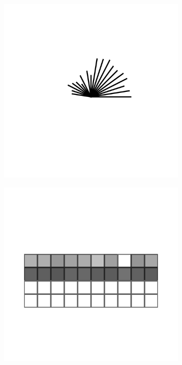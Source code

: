\begin{figure}[ht]
\begin{subfigure}{0.23\linewidth}
\caption{}
\label{subfig:pie}
\end{subfigure}%
\hspace*{0.01\linewidth}%
\begin{subfigure}{0.23\linewidth}
\centering
\includegraphics[width=\linewidth,clip,trim={2.4cm 4cm 1.7cm 4cm}]{infuse/g2}
\caption{}
\label{subfig:star}
\end{subfigure}%
\hspace*{0.01\linewidth}%
\begin{subfigure}{0.23\linewidth}
\centering
\includegraphics[width=\linewidth,clip,trim={2.4cm 4cm 1.7cm 4cm}]{infuse/g3}

\end{subfigure}
\end{figure}
